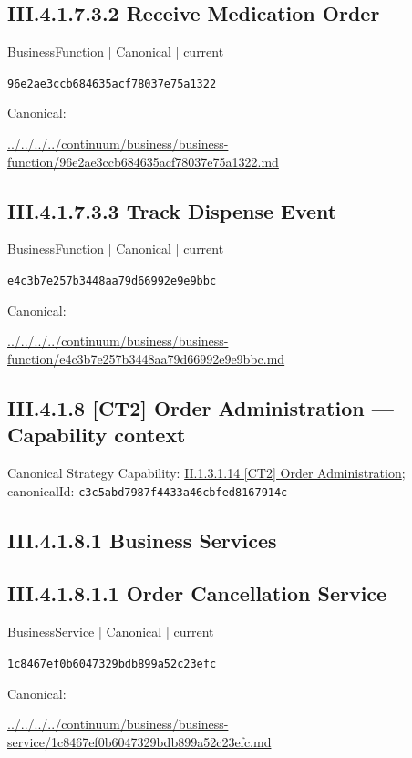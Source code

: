 \documentclass[10pt,a4paper]{article}
\begin{document}
\subsection*{III.4.1.7.3.2 Receive Medication Order}
\label{element-96e2ae3ccb684635acf78037e75a1322}
{\small BusinessFunction | Canonical | current}\par
\texttt{96e2ae3ccb684635acf78037e75a1322}\par
Canonical: \par
{\footnotesize\url{../../../../continuum/business/business-function/96e2ae3ccb684635acf78037e75a1322.md}}\par
\subsection*{III.4.1.7.3.3 Track Dispense Event}
\label{element-e4c3b7e257b3448aa79d66992e9e9bbc}
{\small BusinessFunction | Canonical | current}\par
\texttt{e4c3b7e257b3448aa79d66992e9e9bbc}\par
Canonical: \par
{\footnotesize\url{../../../../continuum/business/business-function/e4c3b7e257b3448aa79d66992e9e9bbc.md}}\par
\subsection*{III.4.1.8 [CT2] Order Administration — Capability context}
Canonical Strategy Capability: \hyperref[element-c3c5abd7987f4433a46cbfed8167914c]{II.1.3.1.14 [CT2] Order Administration}; canonicalId: \texttt{c3c5abd7987f4433a46cbfed8167914c}\par
\subsection*{III.4.1.8.1 Business Services}
\subsection*{III.4.1.8.1.1 Order Cancellation Service}
\label{element-1c8467ef0b6047329bdb899a52c23efc}
{\small BusinessService | Canonical | current}\par
\texttt{1c8467ef0b6047329bdb899a52c23efc}\par
Canonical: \par
{\footnotesize\url{../../../../continuum/business/business-service/1c8467ef0b6047329bdb899a52c23efc.md}}\par
\end{document}
